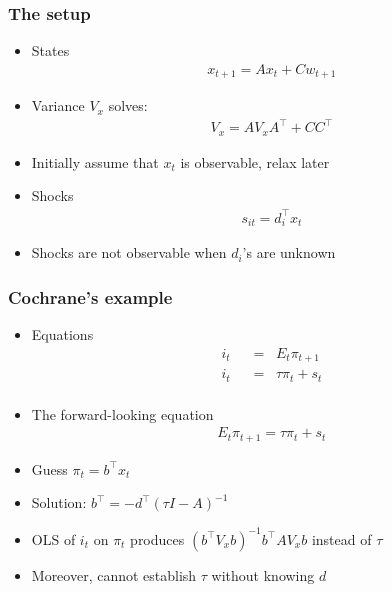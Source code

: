 \documentclass[handout]{beamer}
\begin{document}
\begin{frame}
\frametitle{The setup}

\begin{itemize} \itemsep=\bigskipamount
\item States
\begin{align*}
   x_{t+1} = A x_t + C w_{t+1}
\end{align*}
\item Variance $V_x$ solves:
 \begin{align*}
   V_x = A V_x A^{\top} + CC^{\top}
\end{align*}
\item Initially assume that $x_t$ is observable, relax later
\item Shocks
\begin{align*}
    s_{it}  = d_i^\top x_t
\end{align*}
\item Shocks are not observable when $d_i$'s are unknown
\end{itemize}

\end{frame}

\begin{frame}
\frametitle{Cochrane's example}

\begin{itemize} \itemsep=\bigskipamount
\item Equations %
\begin{align*}
    i_t &\;\;=\;\; E_t \pi_{t+1}  \tag{Fisher equation} \\
    i_t &\;\;=\;\;  \tau \pi_{t} + s_t \tag{Taylor rule} \\
\end{align*}
\item The forward-looking equation
\begin{align*}
   E_t \pi_{t+1} = \tau \pi_{t} + s_t
\end{align*}
\item Guess $\pi_t=b^\top x_t$
\item Solution: $b^\top=-d^{\top}(\tau I-A)^{-1}$
\item OLS of $i_t$ on $\pi_t$ produces $(b^{\top}V_x b)^{-1} b^{\top} A V_x b$ instead of $\tau$
 \item Moreover,  cannot establish $\tau$ without knowing $d$
\end{itemize}

\end{frame}
\end{document}
